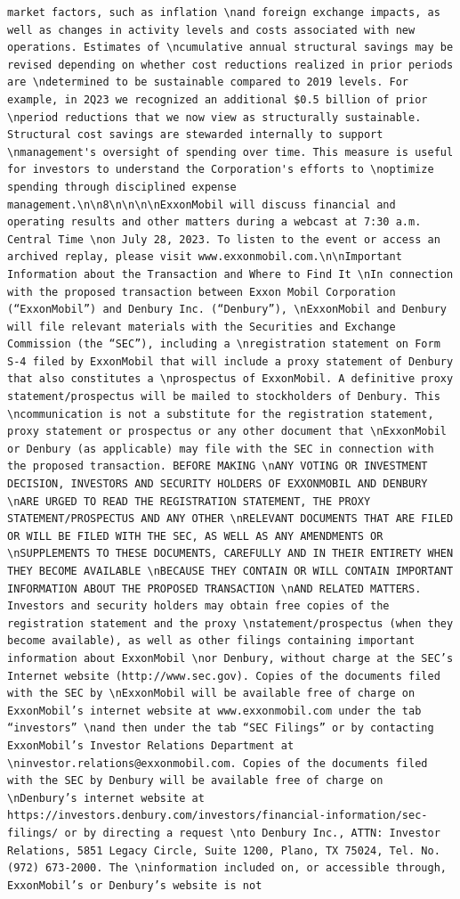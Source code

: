 \documentclass[
  letterpaper,
  DIV=11,
  numbers=noendperiod]{scrreprt}
\begin{document}
\begin{verbatim}
market factors, such as inflation \nand foreign exchange impacts, as well as changes in activity levels and costs associated with new operations. Estimates of \ncumulative annual structural savings may be revised depending on whether cost reductions realized in prior periods are \ndetermined to be sustainable compared to 2019 levels. For example, in 2Q23 we recognized an additional $0.5 billion of prior \nperiod reductions that we now view as structurally sustainable. Structural cost savings are stewarded internally to support \nmanagement's oversight of spending over time. This measure is useful for investors to understand the Corporation's efforts to \noptimize spending through disciplined expense management.\n\n8\n\n\n\nExxonMobil will discuss financial and operating results and other matters during a webcast at 7:30 a.m. Central Time \non July 28, 2023. To listen to the event or access an archived replay, please visit www.exxonmobil.com.\n\nImportant Information about the Transaction and Where to Find It \nIn connection with the proposed transaction between Exxon Mobil Corporation (“ExxonMobil”) and Denbury Inc. (“Denbury”), \nExxonMobil and Denbury will file relevant materials with the Securities and Exchange Commission (the “SEC”), including a \nregistration statement on Form S-4 filed by ExxonMobil that will include a proxy statement of Denbury that also constitutes a \nprospectus of ExxonMobil. A definitive proxy statement/prospectus will be mailed to stockholders of Denbury. This \ncommunication is not a substitute for the registration statement, proxy statement or prospectus or any other document that \nExxonMobil or Denbury (as applicable) may file with the SEC in connection with the proposed transaction. BEFORE MAKING \nANY VOTING OR INVESTMENT DECISION, INVESTORS AND SECURITY HOLDERS OF EXXONMOBIL AND DENBURY \nARE URGED TO READ THE REGISTRATION STATEMENT, THE PROXY STATEMENT/PROSPECTUS AND ANY OTHER \nRELEVANT DOCUMENTS THAT ARE FILED OR WILL BE FILED WITH THE SEC, AS WELL AS ANY AMENDMENTS OR \nSUPPLEMENTS TO THESE DOCUMENTS, CAREFULLY AND IN THEIR ENTIRETY WHEN THEY BECOME AVAILABLE \nBECAUSE THEY CONTAIN OR WILL CONTAIN IMPORTANT INFORMATION ABOUT THE PROPOSED TRANSACTION \nAND RELATED MATTERS.  Investors and security holders may obtain free copies of the registration statement and the proxy \nstatement/prospectus (when they become available), as well as other filings containing important information about ExxonMobil \nor Denbury, without charge at the SEC’s Internet website (http://www.sec.gov). Copies of the documents filed with the SEC by \nExxonMobil will be available free of charge on ExxonMobil’s internet website at www.exxonmobil.com under the tab “investors” \nand then under the tab “SEC Filings” or by contacting ExxonMobil’s Investor Relations Department at \ninvestor.relations@exxonmobil.com. Copies of the documents filed with the SEC by Denbury will be available free of charge on \nDenbury’s internet website at https://investors.denbury.com/investors/financial-information/sec-filings/ or by directing a request \nto Denbury Inc., ATTN: Investor Relations, 5851 Legacy Circle, Suite 1200, Plano, TX 75024, Tel. No. (972) 673-2000. The \ninformation included on, or accessible through, ExxonMobil’s or Denbury’s website is not 
\end{verbatim}
\end{document}
